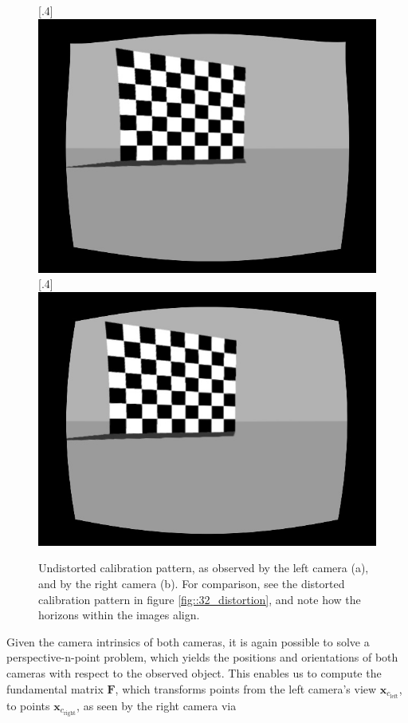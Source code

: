 \begin{figure}[h!]
	\centering
	\captionbox{}%
	[.4\linewidth]{\includegraphics[scale=.2]{chapters/03_fundamentals_of_image_processing/img/gazebo_rectified_left.jpg}}
	\captionbox{}%
	[.4\linewidth]{\includegraphics[scale=.2]{chapters/03_fundamentals_of_image_processing/img/gazebo_rectified_right.jpg}}
	\caption{Undistorted calibration pattern, as observed by the left camera (a), and by the right camera (b). For comparison, see the distorted calibration pattern in figure \ref{fig::32_distortion}, and note how the horizons within the images align.}
	\label{fig::32_rectified}
\end{figure}
Given the camera intrinsics of both cameras, it is again possible to solve a perspective-n-point problem, which yields the positions and orientations of both cameras with respect to the observed object. This enables us to compute the fundamental matrix $\bm{F}$, which transforms points from the left camera's view $\bm{x}_{c_\text{left}}$, to points $\bm{x}_{c_\text{right}}$, as seen by the right camera via
